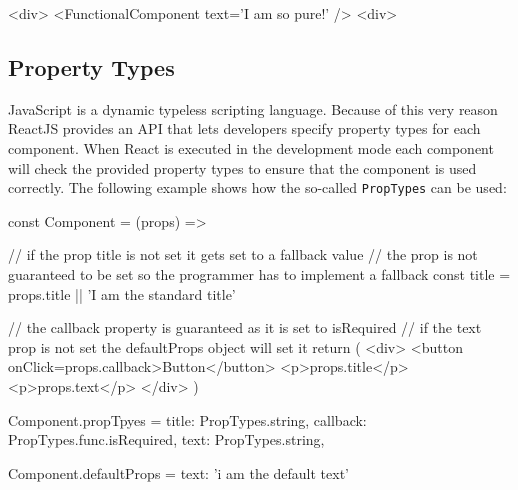 \begin{JsCode}
<div>
  <FunctionalComponent text='I am so pure!' />
<div>
\end{JsCode}






\subsection{Property Types}

JavaScript is a dynamic typeless scripting language. Because of this very reason ReactJS provides an API that lets developers specify property types for each component. When React is executed in the development mode each component will check the provided property types to ensure that the component is used correctly. The following example shows how the so-called \texttt{PropTypes} can be used:\newline

\begin{JsCode}
const Component = (props) => {
  
  // if the prop title is not set it gets set to a fallback value
  // the prop is not guaranteed to be set so the programmer has to implement a fallback
  const title = props.title || 'I am the standard title'
  
  // the callback property is guaranteed as it is set to isRequired
  // if the text prop is not set the defaultProps object will set it
  return (
    <div>
      <button onClick={props.callback}>Button</button>
      <p>{props.title}</p>
      <p>{props.text}</p>
    </div>
  )
}

Component.propTpyes = {
  title: PropTypes.string,
  callback: PropTypes.func.isRequired,
  text: PropTypes.string,
}

Component.defaultProps = {
  text: 'i am the default text'
}

\end{JsCode}


